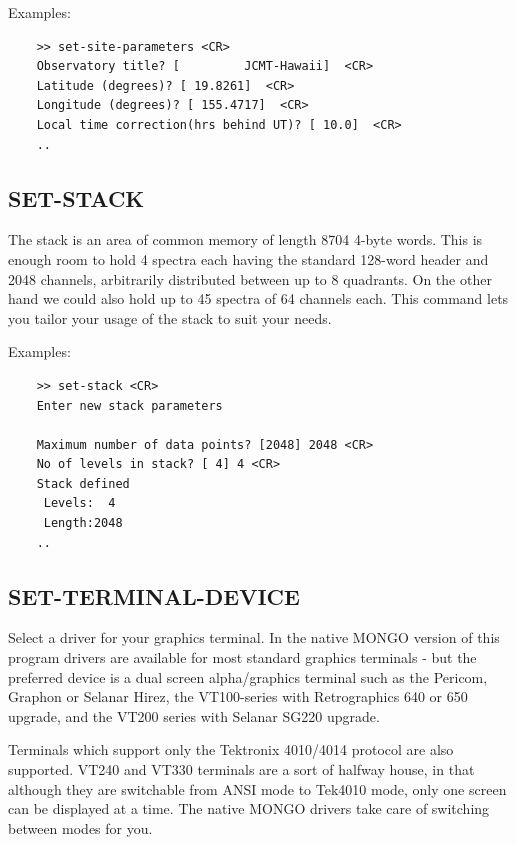\documentclass[11pt,twoside]{report}
\begin{document}
Examples:
\begin{verbatim}
    >> set-site-parameters <CR>
    Observatory title? [         JCMT-Hawaii]  <CR>
    Latitude (degrees)? [ 19.8261]  <CR>
    Longitude (degrees)? [ 155.4717]  <CR>
    Local time correction(hrs behind UT)? [ 10.0]  <CR>
    ..
\end{verbatim}

\subsection{SET-STACK} 

The stack is an area of common memory of length 8704 4-byte words. This is
enough room to hold 4 spectra each having the standard 128-word header and 2048
channels, arbitrarily distributed between up to 8 quadrants. On the other hand
we could also hold up to 45 spectra of 64 channels each. This command lets you
tailor your usage of the stack to suit your needs. 

Examples:
\begin{verbatim}
    >> set-stack <CR>
    Enter new stack parameters

    Maximum number of data points? [2048] 2048 <CR>
    No of levels in stack? [ 4] 4 <CR>
    Stack defined 
     Levels:  4
     Length:2048
    ..
\end{verbatim}

\subsection{SET-TERMINAL-DEVICE} 

Select a driver for your graphics terminal. In the native MONGO version
of this program drivers are available for most standard graphics terminals -
but the preferred device is a dual screen alpha/graphics terminal such as the
Pericom, Graphon or Selanar Hirez, the VT100-series with Retrographics 640 or
650 upgrade, and the VT200 series with Selanar SG220 upgrade.   
 

Terminals which support only the Tektronix 4010/4014 protocol are also
supported. VT240 and VT330 terminals are a sort of halfway house, in that
 
although they are switchable from ANSI mode to Tek4010 mode, only one
screen can be displayed at a time. The native MONGO drivers take care of
switching between modes for you.
\end{document}
